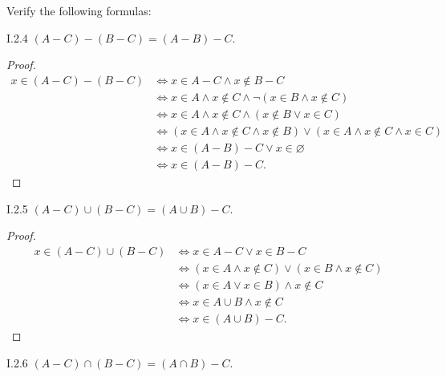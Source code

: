 Verify the following formulas:

\begin{problem}{I.2.4}
\( (A - C) - (B - C) = (A - B) - C \).
\end{problem}

\begin{proof}
	\begingroup
	\allowdisplaybreaks%
	\begin{align*}
		x \in (A - C) - (B - C) & \iff x \in A - C \land x \notin B - C                                                          \\
		                        & \iff x \in A \land x \notin C \land \neg (x \in B \land x \notin C)                            \\
		                        & \iff x \in A \land x \notin C \land (x \notin B \lor x \in C)                                  \\
		                        & \iff (x \in A \land x \notin C \land x \notin B) \lor (x \in A \land x \notin C \land x \in C) \\
		                        & \iff x \in (A - B) - C \lor x \in \varnothing                                                  \\
		                        & \iff x \in (A - B) - C.
	\end{align*}
	\endgroup
\end{proof}

\begin{problem}{I.2.5}
\( (A - C) \cup (B - C) = (A \cup B) - C \).
\end{problem}

\begin{proof}
	\begingroup
	\allowdisplaybreaks%
	\begin{align*}
		x \in (A - C) \cup (B - C) & \iff x \in A - C \lor x \in B - C                               \\
		                           & \iff (x \in A \land x \notin C) \lor (x \in B \land x \notin C) \\
		                           & \iff (x \in A \lor x \in B) \land x \notin C                    \\
		                           & \iff x \in A \cup B \land x \notin C                            \\
		                           & \iff x \in (A \cup B) - C.
	\end{align*}
	\endgroup
\end{proof}

\begin{problem}{I.2.6}
\( (A - C) \cap (B - C) = (A \cap B) - C \).
\end{problem}

